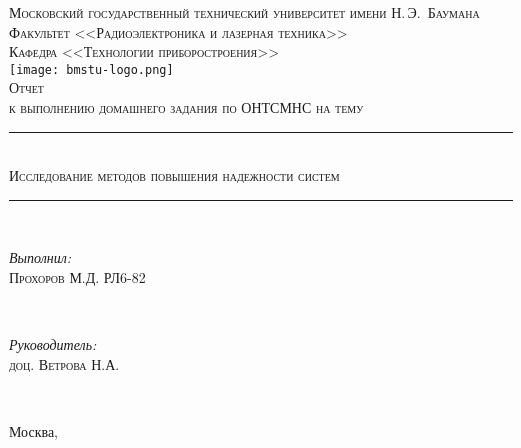 \newcommand{\HRule}{\rule{\linewidth}{.5mm}\\}

\begin{center}

\textsc{\large Московский государственный технический университет имени Н.\,Э.~Баумана}\\[5mm]
\textsc{Факультет <<Радиоэлектроника и лазерная техника>>}\\
\textsc{Кафедра <<Технологии приборостроения>>}\\[2.5mm]

\texttt{[image: bmstu-logo.png]}\\[0.5cm]

\textsc{\large Отчет}\\
\textsc{к выполнению домашнего задания по ОНТСМНС на тему}

\HRule[0.5cm]
{\huge \textsc{Исследование методов повышения надежности систем}}
\HRule[2cm]

        \begin{minipage}{0.4\textwidth}
            \begin{flushleft} \large
                \emph{Выполнил:}\\
                \textsc{Прохоров} М.Д. РЛ6-82
            \end{flushleft}
        \end{minipage}
        ~
        \begin{minipage}{0.4\textwidth}
            \begin{flushright} \large
                \emph{Руководитель:} \\
                \textsc{доц. Ветрова} Н.А.
            \end{flushright}
        \end{minipage}\\[1cm]

\vfill


{\large Москва, \the\year}

\end{center}

\newpage
{}



